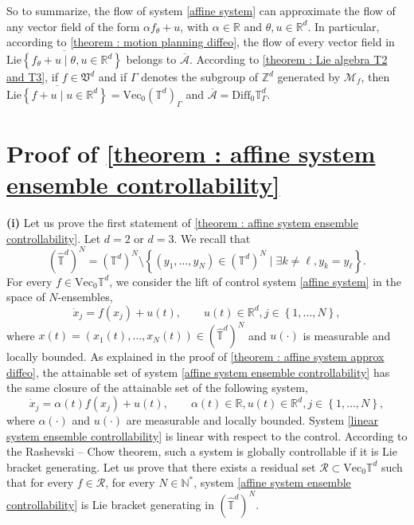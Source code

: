 \documentclass[10pt]{article}
\newcommand{\R}{{\mathbb R}}
\newcommand{\T}{{\mathbb T}}
\newcommand{\N}{{\mathbb N}}
\newcommand{\Z}{{\mathbb Z}}
\newcommand{\M}{{\mathcal M}}
\newcommand{\ov}{\overline}
\begin{document}
So to summarize, the flow of system \eqref{affine system} can approximate the flow of any vector field of the form $\alpha f_\theta + u$, with $\alpha \in \R$ and $\theta, u \in \R^d$. In particular, according to \cref{theorem : motion planning diffeo}, the flow of every vector field in $\ov{\mathrm{Lie}\left\{f_\theta +u \mid \theta,u \in \R^d\right\}}$ belongs to $\ov{\mathcal{A}}$. According to \cref{theorem : Lie algebra T2 and T3}, if $f \in \mathfrak{V}^d$ and if $\Gamma$ denotes the subgroup of $\Z^d$ generated by $\M_f$, then $\ov{\mathrm{Lie}\left\{f+u\mid u \in \R^d\right\}}=\mathrm{Vec}_0(\T^d)_\Gamma$ and $\ov{\mathcal{A}}=\mathrm{Diff}_0\T^d_\Gamma$.

\section{Proof of \cref{theorem : affine system ensemble controllability}} 

\textbf{(i)} Let us prove the first statement of \cref{theorem : affine system ensemble controllability}. Let $d=2$ or $d=3$. We recall that 
$$(\hat{\T}^d)^N = (\T^d)^N\setminus \left\{(y_1,\dots,y_N)\in (\T^d)^N \mid \exists k\neq \ell, y_k=y_\ell\right\}.$$
For every $f \in \mathrm{Vec}_0\T^d$, we consider the lift of control system \eqref{affine system} in the space of $N$-ensembles,
\begin{equation} \label{affine system ensemble controllability}
     \dot{x}_j=f(x_j)+u(t), \qquad u(t)\in \R^d,j \in \left\{1,\dots,N\right\},  
\end{equation}
where $x(t)=(x_1(t),\dots,x_N(t))\in (\hat{\T}^d)^N$ and $u(\cdot)$ is measurable and locally bounded. As explained in the proof of \cref{theorem : affine system approx diffeo}, the attainable set of system \eqref{affine system ensemble controllability} has the same closure of the attainable set of the following system,
\begin{equation} \label{linear system ensemble controllability}
    \dot{x}_j=\alpha(t)f(x_j)+u(t), \qquad \alpha(t)\in \R,u(t)\in \R^d,j \in \left\{1,\dots,N\right\},
\end{equation}
where $\alpha(\cdot)$ and $u(\cdot)$ are measurable and locally bounded. System \eqref{linear system ensemble controllability} is linear with respect to the control. According to the Rashevski -- Chow theorem, such a system is globally controllable if it is Lie bracket generating. Let us prove that there exists a residual set $\mathcal{R}\subset \mathrm{Vec}_0\T^d$ such that for every $f \in \mathcal{R}$, for every $N\in \N^*$, system \eqref{affine system ensemble controllability} is Lie bracket generating in $(\hat{\T}^d)^N$.
\end{document}
